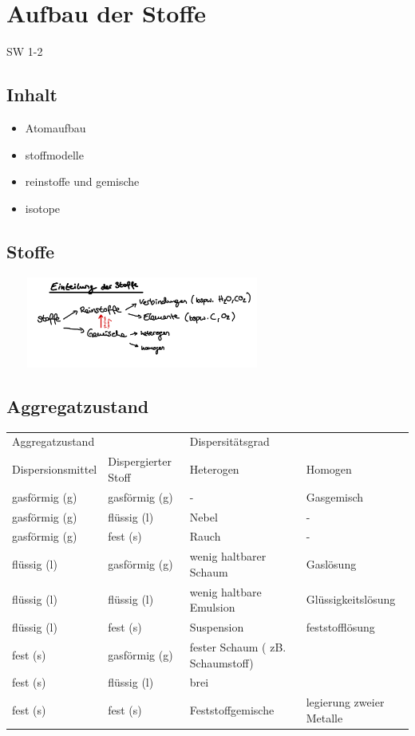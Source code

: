 \section{Aufbau der Stoffe} {SW 1-2}

\subsection{Inhalt}
\begin{itemize}
\item Atomaufbau
\item stoffmodelle
\item reinstoffe und gemische
\item isotope
\end{itemize}
            
\subsection{Stoffe}	

\renewcommand{\arraystretch}{1.2}
\includegraphics[width=9cm, height=3cm]{images/Stoffe.png}

\subsection{Aggregatzustand}		

{\tiny
\begin{tabular} {ll | ll} 
	Aggregatzustand  	&     					& Dispersitätsgrad    &  \\ 
	Dispersionsmittel  	& Dispergierter Stoff	& Heterogen   		& Homogen        \\
	gasförmig (g) 		& gasförmig (g)        	& -          		& Gasgemisch        \\
	gasförmig (g)		& flüssig (l)			& Nebel				& -		\\
	gasförmig (g)		& fest (s)				& Rauch				& -		\\
	flüssig (l)			& gasförmig (g) 		& wenig haltbarer Schaum	& Gaslösung		\\
	flüssig (l)			& flüssig (l) 			& wenig haltbare Emulsion				& Glüssigkeitslösung		\\
	flüssig (l)			& fest (s) 				& Suspension				& feststofflösung	\\
	fest (s)			& gasförmig (g) 		& fester Schaum ( zB. Schaumstoff)					&		\\
	fest (s)			& flüssig (l) 			& brei				&		\\
	fest (s)			& fest (s) 				& Feststoffgemische				& legierung zweier Metalle	\\
	
\end{tabular}
}

